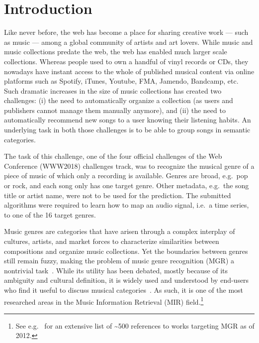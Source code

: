 \documentclass[sigconf]{acmart}
\begin{document}


\maketitle

\section{Introduction}

Like never before, the web has become a place for sharing creative work --- such as music --- among a global community of artists and art lovers. While music and music collections predate the web, the web has enabled much larger scale collections. Whereas people used to own a handful of vinyl records or CDs, they nowadays have instant access to the whole of published musical content via online platforms such as Spotify, iTunes, Youtube, FMA, Jamendo, Bandcamp, etc. Such dramatic increases in the size of music collections has created two challenges: (i) the need to automatically organize a collection (as users and publishers cannot manage them manually anymore), and (ii) the need to automatically recommend new songs to a user knowing their listening habits. An underlying task in both those challenges is to be able to group songs in semantic categories.

The task of this challenge, one of the four official challenges of the Web Conference (WWW2018) challenges track, was to recognize the musical genre of a piece of music of which only a recording is available. Genres are broad, e.g.\ pop or rock, and each song only has one target genre.
Other metadata, e.g.\ the song title or artist name, were not to be used for the prediction. The submitted algorithms were required to learn how to map an audio signal, i.e.\ a time series, to one of the 16 target genres.

Music genres are categories that have arisen through a complex interplay of cultures, artists, and market forces to characterize similarities between compositions and organize music collections. Yet the boundaries between genres still remain fuzzy, making the problem of music genre recognition (MGR) a nontrivial task~\cite{mir_review_genre}. While its utility has been debated, mostly because of its ambiguity and cultural definition, it is widely used and understood by end-users who find it useful to discuss musical categories~\cite{mgr_why}. As such, it is one of the most researched areas in the Music Information Retrieval (MIR) field.\footnote{See e.g.\ \cite{mgr_eval_1} for an extensive list of \textasciitilde500 references to works targeting MGR as of 2012.}
\end{document}
